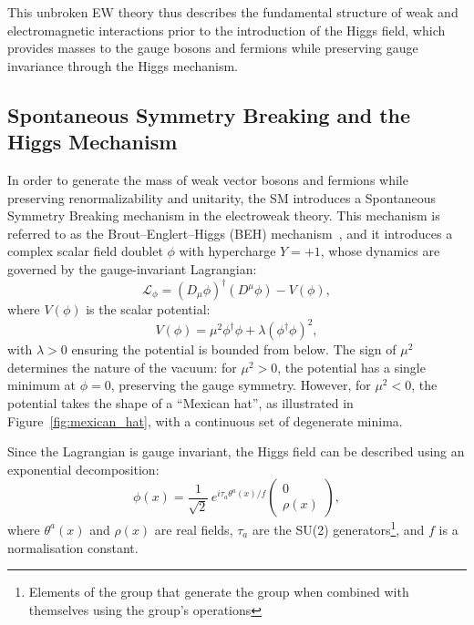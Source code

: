 This unbroken EW theory thus describes the fundamental structure of weak and electromagnetic interactions prior to the introduction of the Higgs field, which provides masses to the gauge bosons and fermions while preserving gauge invariance through the Higgs mechanism.

\subsection{Spontaneous Symmetry Breaking and the Higgs Mechanism}
\label{subsec:higgs_mech}

In order to generate the mass of weak vector bosons and fermions while preserving renormalizability and unitarity, the SM introduces a Spontaneous Symmetry Breaking mechanism in the electroweak theory. 
This mechanism is referred to as the Brout–Englert–Higgs (BEH) mechanism~\cite{Brout,HiggsSpontan}, and it introduces a complex scalar field doublet $\phi$ with hypercharge $Y=+1$, whose dynamics are governed by the gauge-invariant Lagrangian:
\begin{equation}
\mathcal{L}_\phi = (D_\mu \phi)^\dagger(D^\mu \phi) - V(\phi),
\end{equation}
where $V(\phi)$ is the scalar potential:
\begin{equation}
V(\phi) = \mu^2 \phi^\dagger \phi + \lambda(\phi^\dagger \phi)^2,
\label{eq:higgs_potential}
\end{equation}
with $\lambda > 0$ ensuring the potential is bounded from below. The sign of $\mu^2$ determines the nature of the vacuum: for $\mu^2 > 0$, the potential has a single minimum at $\phi = 0$, preserving the gauge symmetry. However, for $\mu^2 < 0$, the potential takes the shape of a “Mexican hat”, as illustrated in Figure~\ref{fig:mexican_hat}, with a continuous set of degenerate minima.

Since the Lagrangian is gauge invariant, the Higgs field can be described using an exponential decomposition:
\begin{equation}
\phi(x) = \frac{1}{\sqrt{2}} \, e^{i \tau_{a} \theta^a(x)/f} \begin{pmatrix}
0 \\
\rho(x)
\end{pmatrix},
\label{eq:higgs_param}
\end{equation}
where $\theta^a(x)$ and $\rho(x)$ are real fields, $\tau_{a}$ are the SU(2) generators\footnote{Elements of the group that generate the group when combined with themselves using the group's operations}, and $f$ is a normalisation constant.


